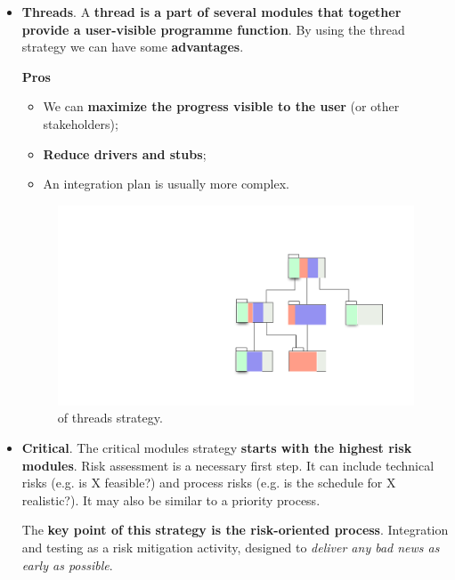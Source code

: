 \begin{itemize}
\begin{itemize}
        \item \textbf{Threads}. A \textbf{thread is a part of several modules that together provide a user-visible programme function}. By using the thread strategy we can have some \textbf{advantages}.
        \begin{flushleft}
            \textcolor{Green3}{ \textbf{Pros}}
        \end{flushleft}
        \begin{itemize}
            \item We can \textbf{maximize the progress visible to the user} (or other stakeholders);
            \item \textbf{Reduce drivers and stubs};
            \item An integration plan is usually more complex.
        \end{itemize}
        \begin{figure}[!htp]
            \centering
            \includegraphics[width=.6\textwidth]{img/threads-1.pdf}
            \caption{ of threads strategy.}
        \end{figure}
        
        \item \textbf{Critical}. The critical modules strategy \textbf{starts with the highest risk modules}. Risk assessment is a necessary first step. It can include technical risks (e.g. is X feasible?) and process risks (e.g. is the schedule for X realistic?). It may also be similar to a priority process.

        The \textbf{key point of this strategy is the risk-oriented process}. Integration and testing as a risk mitigation activity, designed to \emph{deliver any bad news as early as possible}.
    \end{itemize}
\end{itemize}

\newpage

